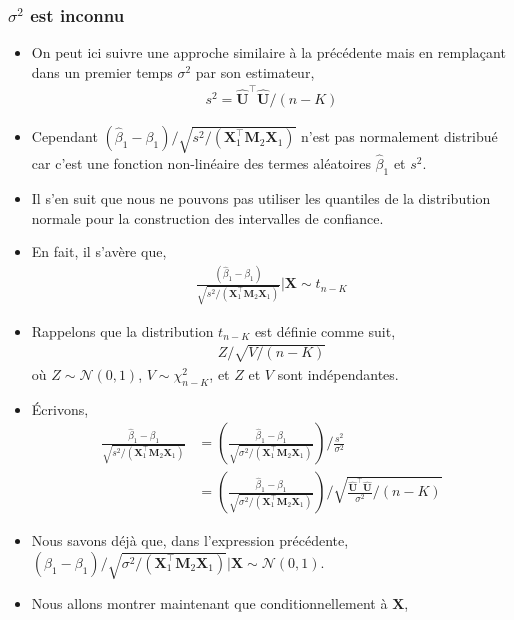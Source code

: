 \begin{frame}[allowframebreaks]\frametitle{$\sigma^2$ est inconnu}
\begin{itemize}
\item  On peut ici suivre une approche similaire à la précédente mais en remplaçant dans un premier temps $\sigma^2$ par son estimateur,
\begin{align*}
s^2 = \widehat{\mathbf{U}}^\top \widehat{\mathbf{U}}/(n-K)
\end{align*}
\item Cependant $(\widehat{\beta}_1-\beta_1)/
\sqrt{s^2/(\mathbf{X}_1^\top\mathbf{M}_2\mathbf{X}_1)}$ n'est pas normalement distribué car c'est une fonction non-linéaire des termes aléatoires $\widehat{\beta}_1$ et $s^2$. 
\item Il s'en suit que nous ne pouvons pas utiliser les quantiles de la distribution normale pour la construction des intervalles de confiance.
\item En fait, il s'avère que,
\begin{align}
\frac{(\widehat{\beta}_1-\beta_1)}{\sqrt{s^2/(\mathbf{X}_1^\top\mathbf{M}_2\mathbf{X}_1)}}
| \mathbf{X}
\sim t_{n-K}
\label{eq22}
\end{align}
\item Rappelons que la distribution $t_{n-K}$ est définie comme suit,
\begin{align*}
Z/\sqrt{V/(n-K)}
\end{align*}
où $Z\sim \mathcal{N}(0,1)$, $V\sim \chi^2_{n-K}$, et $Z$ et $V$ sont indépendantes.
\item  \'Ecrivons,
\begin{align}
\frac{\widehat{\beta}_1-\beta_1}{\sqrt{s^2/(\mathbf{X}_1^\top\mathbf{M}_2\mathbf{X}_1)}}
&= \left(
\frac{\widehat{\beta}_1-\beta_1}{\sqrt{\sigma^2/(\mathbf{X}_1^\top\mathbf{M}_2\mathbf{X}_1)}}
\right)/
\frac{s^2}{\sigma^2}\nonumber \\
&= 
 \left(
\frac{\widehat{\beta}_1-\beta_1}{\sqrt{\sigma^2/(\mathbf{X}_1^\top\mathbf{M}_2\mathbf{X}_1)}}
\right)/
\sqrt{\frac{\widehat{\mathbf{U}}^\top\widehat{\mathbf{U}}}{\sigma^2}/(n-K)}
\label{eq32}
\end{align}
\item Nous savons déjà que, dans l'expression précédente, $(\widehat{\beta}_1-\beta_1)/\sqrt{\sigma^2/(\mathbf{X}_1^\top\mathbf{M}_2\mathbf{X}_1)} |\mathbf{X} \sim \mathcal{N}(0,1)$. 
\item Nous allons montrer maintenant que conditionnellement à $\mathbf{X}$,
\begin{align}

\end{align}
\end{itemize}
\end{frame}
